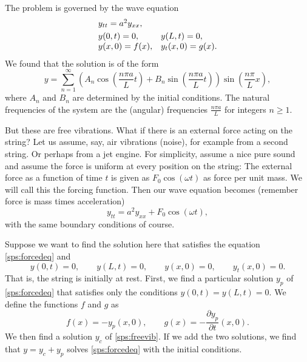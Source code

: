 The problem is governed by the wave equation
\begin{equation} \label{sps:freevib}
\begin{array}{ll}
y_{tt} = a^2 y_{xx} , & \\
\noalign{\smallskip}
y(0,t) = 0 , & y(L,t) = 0 , \\
y(x,0) = f(x) , & y_t(x,0) = g(x) .
\end{array}
\end{equation}
We found that the solution is of the form
\begin{equation*}
y = 
\sum_{n=1}^\infty \left( A_n \cos \left( \frac{n\pi a}{L} t \right) +
B_n \sin \left( \frac{n\pi a}{L} t \right) \right)
\sin \left( \frac{n\pi}{L} x \right) ,
\end{equation*}
where $A_n$ and $B_n$ are determined by the initial conditions.  The natural
frequencies of the system are the (angular) frequencies $\frac{n \pi a}{L}$
for integers $n \geq 1$.

But these are free vibrations.  What if there is an external force acting on
the string?  Let us assume, say, air vibrations (noise), for example from a second
string.  Or perhaps from a jet engine.  For simplicity, assume a nice pure
sound and assume the force is uniform at every position on the string:
The external force as a function of time $t$ is given as
$F_0 \cos (\omega t)$ as force per unit mass.
We will call this the forcing function.  Then our wave
equation becomes (remember force is mass times acceleration)
\begin{equation} \label{sps:forcedeq}
y_{tt} = a^2 y_{xx} + F_0 \cos ( \omega t) ,
\end{equation}
with the same boundary conditions of course.

Suppose we want to find the solution here that satisfies the equation
\eqref{sps:forcedeq} and
\begin{equation} \label{sps:forcedinitcond}
y(0,t) = 0, \qquad y(L,t) = 0, \qquad
y(x,0) = 0, \qquad y_t(x,0) = 0.
\end{equation}
That is, the string is initially at rest.  First, we find a particular
solution $y_p$ of \eqref{sps:forcedeq} that satisfies
only the conditions
$y(0,t) = y(L,t) = 0$.  We define the functions $f$ and $g$ as
\begin{equation*}
f(x) = -y_p(x,0), \qquad g(x) = -\frac{\partial y_p}{\partial t} (x,0) .
\end{equation*}
We then find a solution $y_c$ of \eqref{sps:freevib}.  If we add the two
solutions, we find that $y = y_c + y_p$ solves \eqref{sps:forcedeq} with
the initial conditions.


